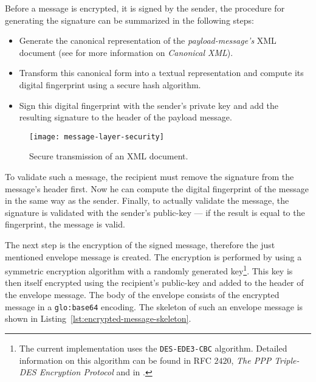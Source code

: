 Before a message  is encrypted, it is signed by  the sender, the procedure
for generating the signature can be summarized in the following steps:

\begin{itemize}
\item     Generate     the     canonical     representation     of     the
  \emph{payload-message's} XML document (see \cite{canonical-xml} for more
  information on \emph{Canonical XML}).
\item  Transform this  canonical form  into a  textual  representation and
  compute its digital fingerprint using a secure hash algorithm.
\item Sign this digital fingerprint  with the sender's private key and add
  the resulting signature to the header of the payload message.
\end{itemize}

\begin{figure}[ht]
  \centering
  \texttt{[image: message-layer-security]}
  \caption[Message Layer Security]{Secure transmission of an XML document.}
  \label{fig:net-mls}
\end{figure}

To validate such  a message, the recipient must  remove the signature from
the message's header first. Now  he can compute the digital fingerprint of
the message in the same way  as the sender.  Finally, to actually validate
the message, the  signature is validated with the  sender's public-key ---
if the result is equal to the fingerprint, the message is valid.

The next step is the encryption  of the signed message, therefore the just
mentioned  envelope message is  created.  The  encryption is  performed by
using  a   symmetric  encryption  algorithm  with   a  randomly  generated
key\footnote{The  current  implementation  uses the  \texttt{DES-EDE3-CBC}
  algorithm.  Detailed information  on this algorithm can be  found in RFC
  $2420$,   \emph{The   PPP  Triple-DES   Encryption   Protocol}  and   in
  \cite{schneier95}.}.   This  key  is  then itself  encrypted  using  the
recipient's public-key  and added to  the header of the  envelope message.
The  body  of  the  envelope  consists  of  the  encrypted  message  in  a
\texttt{\gls{glo:base64}}  encoding.   The skeleton  of  such an  envelope
message is shown in Listing~\ref{lst:encrypted-message-skeleton}.

